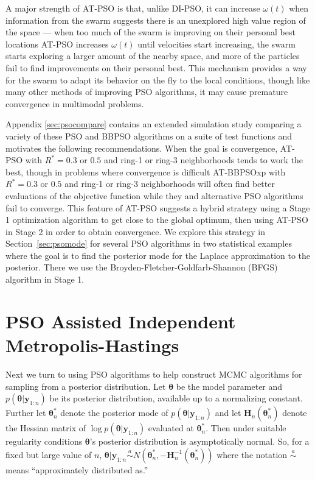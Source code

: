 \documentclass[12pt]{article}
\begin{document}
A major strength of AT-PSO is that, unlike DI-PSO, it can increase $\omega(t)$ when information from the swarm suggests there is an unexplored high value region of the space --- when too much of the swarm is improving on their personal best locations AT-PSO increases $\omega(t)$ until velocities start increasing, the swarm starts exploring a larger amount of the nearby space, and more of the particles fail to find improvements on their personal best. This mechanism provides a way for the swarm to adapt its behavior on the fly to the local conditions, though like many other methods of improving PSO algorithms, it may cause premature convergence in multimodal problems.

Appendix \ref{sec:psocompare} contains an extended simulation study comparing a variety of these PSO and BBPSO algorithms on a suite of test functions and motivates the following recommendations. When the goal is convergence, AT-PSO with $R^*=0.3$ or $0.5$ and ring-1 or ring-3 neighborhoods tends to work the best, though in problems where convergence is difficult AT-BBPSOxp with $R^*=0.3$ or $0.5$ and ring-1 or ring-3 neighborhoods will often find better evaluations of the objective function while they and alternative PSO algorithms fail to converge. This feature of AT-PSO suggests a hybrid strategy using a Stage 1 optimization algorithm to get close to the global optimum, then using AT-PSO in Stage 2 in order to obtain convergence. We explore this strategy in Section~\ref{sec:psomode} for several PSO algorithms in two statistical examples where the goal is to find the posterior mode for the Laplace approximation to the posterior. There we use the Broyden-Fletcher-Goldfarb-Shannon (BFGS) algorithm in Stage 1.




\section{PSO Assisted Independent Metropolis-Hastings}\label{sec:psometrop}
Next we turn to using PSO algorithms to help construct MCMC algorithms for sampling from a posterior distribution. Let $\bm{\theta}$ be the model parameter and $ p(\bm{\theta}|\bm{y}_{1:n})$ be its posterior distribution, available up to a normalizing constant. Further let $\bm{\theta}^*_n$ denote the posterior mode of $p(\bm{\theta}|\bm{y}_{1:n})$ and let $\bm{H}_n(\bm{\theta}^*_n)$ denote the Hessian matrix of $\log p(\bm{\theta}|\bm{y}_{1:n})$ evaluated at $\bm{\theta}_n^*$. Then under suitable regularity conditions \citep[Sections~7.4.2~and~7.4.3]{schervish1997theory} $\bm{\theta}$'s posterior distribution is asymptotically normal. So, for a fixed but large value of $n$, $\bm{\theta}|\bm{y}_{1:n} \stackrel{a}{\sim} N(\bm{\theta}_n^*, -\bm{H}_n^{-1}(\bm{\theta}^*_n))$ where the notation $\stackrel{a}{\sim}$ means ``approximately distributed as.''
\end{document}
